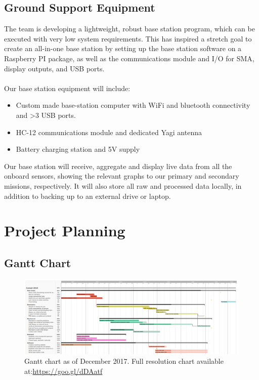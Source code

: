 \documentclass{report}
\begin{document}
	\section{Ground Support Equipment}
		The team is developing a lightweight, robust base station program, which 
		can be executed with very low system requirements. This has inspired a
		stretch goal to create an all-in-one base station by setting up the base 
		station software on a Raspberry PI package, as well as the communications
		module and I/O for SMA, display outputs, and USB ports.
		\\\\
		Our base station equipment will include:
		\begin{itemize}
			\item Custom made base-station computer with WiFi and bluetooth
			connectivity and >3 USB ports.
			\item HC-12 communications module and dedicated Yagi antenna
			\item Battery charging station and 5V supply
		\end{itemize}
		Our base station will receive, aggregate and display live data
		from all the onboard sensors, showing the relevant graphs to our primary
		and secondary missions, respectively. It will also store all raw and 
		processed data locally, in addition to backing up to an external drive or 
		laptop.
	

\chapter{Project Planning}
	\section{Gantt Chart}
	\begin{figure}[h]
		\centering
		\includegraphics[width=\textwidth]{ganttDec.PNG}
		\caption{Gantt chart as of December 2017. Full resolution chart 
		available at:\url{https://goo.gl/dDAatf}}
	\end{figure}
	
\end{document}
